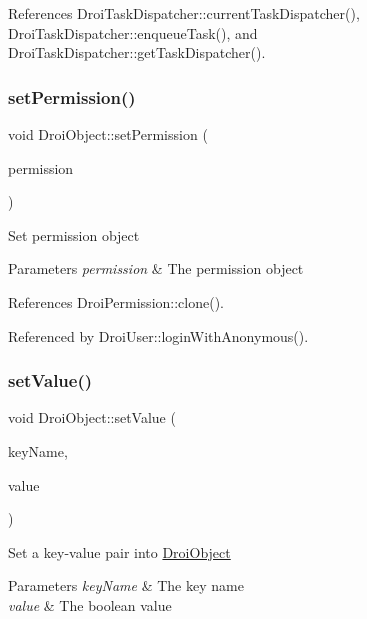 References Droi\+Task\+Dispatcher\+::current\+Task\+Dispatcher(), Droi\+Task\+Dispatcher\+::enqueue\+Task(), and Droi\+Task\+Dispatcher\+::get\+Task\+Dispatcher().

\mbox{\label{class_droi_object_a3988101bf6df709055f7c64ebb166474}} 
\subsubsection{\texorpdfstring{set\+Permission()}{setPermission()}}
{\footnotesize\ttfamily void Droi\+Object\+::set\+Permission (\begin{DoxyParamCaption}\item[{\hyperlink{class_droi_permission}{Droi\+Permission} $\ast$}]{permission }\end{DoxyParamCaption})}

Set permission object 
\begin{DoxyParams}{Parameters}
{\em permission} & The permission object \\
\hline
\end{DoxyParams}


References Droi\+Permission\+::clone().



Referenced by Droi\+User\+::login\+With\+Anonymous().

\mbox{\label{class_droi_object_a01fa14894085c5c83c86044c2506ca54}} 
\subsubsection{\texorpdfstring{set\+Value()}{setValue()}\hspace{0.1cm}{\footnotesize\ttfamily [1/11]}}
{\footnotesize\ttfamily void Droi\+Object\+::set\+Value (\begin{DoxyParamCaption}\item[{const std\+::string \&}]{key\+Name,  }\item[{bool}]{value }\end{DoxyParamCaption})}

Set a key-\/value pair into \hyperlink{class_droi_object}{Droi\+Object} 
\begin{DoxyParams}{Parameters}
{\em key\+Name} & The key name \\
\hline
{\em value} & The boolean value \\
\hline
\end{DoxyParams}



